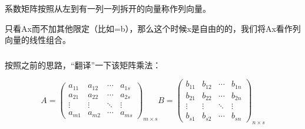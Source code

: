 \documentclass[12pt,a4paper]{book}
\begin{document}
系数矩阵按照从左到有一列一列拆开的向量称作列向量。

只看Ax而不加其他限定（比如=b），那么这个时候x是自由的的，我们将Ax看作列向量的线性组合。

{\subsubsection{\centering\fontsize{20pt}{15pt}}}

按照之前的思路，“翻译”一下该矩阵乘法：

\[
A=\begin{pmatrix}
a_{11} & a_{12} & \cdots & a_{1s}\\
a_{21} & a_{22} & \cdots & a_{2s}\\
\vdots & \vdots & \ddots & \vdots\\
a_{m1} & a_{m2} & \cdots & a_{ms}
\end{pmatrix}_{m\times s}
B=\begin{pmatrix}
b_{11} & b_{12} & \cdots & b_{1n}\\
b_{21} & b_{22} & \cdots & b_{2n}\\
\vdots & \vdots & \ddots & \vdots\\
b_{s1} & b_{s2} & \cdots & b_{sn}
\end{pmatrix}_{n\times s}
\]
\end{document}
